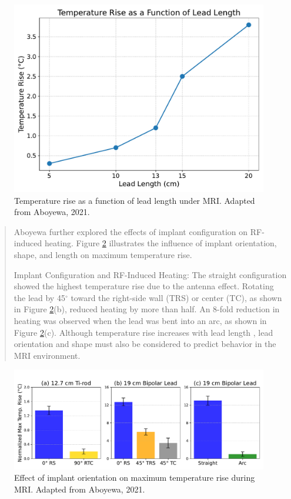 \documentclass[final]{article}
\newcommand{\boldtext}[1]{{\fontseries{b}\selectfont #1}}
\begin{document}
\begin{multicols}{3}
\begin{figure}[H]
    \centering
    \includegraphics[width=0.5\linewidth]{FigTab.pdf} %
    \caption{Temperature rise as a function of lead length under MRI. Adapted from Aboyewa, 2021.}
    \label{fig:lead_temp_rise}
\end{figure}

\begin{quote}
Aboyewa further explored the effects of implant configuration on RF-induced heating. Figure \ref{fig:implant_orientation} illustrates the influence of implant orientation, shape, and length on maximum temperature rise.

\boldtext{Implant Configuration and RF-Induced Heating:} 
The straight configuration showed the highest temperature rise due to the antenna effect. Rotating the lead by 45$^\circ$ toward the right-side wall (TRS) or center (TC), as shown in Figure \ref{fig:implant_orientation}(b), reduced heating by more than half. An 8-fold reduction in heating was observed when the lead was bent into an arc, as shown in Figure \ref{fig:implant_orientation}(c). Although temperature rise increases with lead length \cite{aboyewa2021}, lead orientation and shape must also be considered to predict behavior in the MRI environment.  
\end{quote}



\begin{center}
\end{center}

\vspace{-3em} %


\begin{figure}[H]
    \centering
    \includegraphics[width=0.9\linewidth]{Figure_4_9_Implant_Configuration_Adjusted_Y_Small.pdf}
    \caption{Effect of implant orientation on maximum temperature rise during MRI. Adapted from Aboyewa, 2021.}
    \label{fig:implant_orientation}
\end{figure}


\end{multicols}
\end{document}
